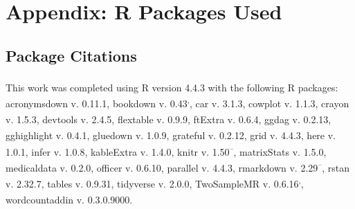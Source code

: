 \documentclass[
]{article}
\begin{document}
\begin{table}
\centering
{}
\end{table}

\newpage

\section{Appendix: R Packages Used}\label{appendix-pkg}

\subsection{Package Citations}\label{package-citations}

This work was completed using R version 4.4.3\textsuperscript{} with the following R packages: acronymsdown v. 0.11.1\textsuperscript{}, bookdown v. 0.43\textsuperscript{,}, car v. 3.1.3\textsuperscript{}, cowplot v. 1.1.3\textsuperscript{}, crayon v. 1.5.3\textsuperscript{}, devtools v. 2.4.5\textsuperscript{}, flextable v. 0.9.9\textsuperscript{}, ftExtra v. 0.6.4\textsuperscript{}, ggdag v. 0.2.13\textsuperscript{}, gghighlight v. 0.4.1\textsuperscript{}, gluedown v. 1.0.9\textsuperscript{}, grateful v. 0.2.12\textsuperscript{}, grid v. 4.4.3\textsuperscript{}, here v. 1.0.1\textsuperscript{}, infer v. 1.0.8\textsuperscript{}, kableExtra v. 1.4.0\textsuperscript{}, knitr v. 1.50\textsuperscript{--}, matrixStats v. 1.5.0\textsuperscript{}, medicaldata v. 0.2.0\textsuperscript{}, officer v. 0.6.10\textsuperscript{}, parallel v. 4.4.3\textsuperscript{}, rmarkdown v. 2.29\textsuperscript{--}, rstan v. 2.32.7\textsuperscript{}, tables v. 0.9.31\textsuperscript{}, tidyverse v. 2.0.0\textsuperscript{}, TwoSampleMR v. 0.6.16\textsuperscript{,}, wordcountaddin v. 0.3.0.9000\textsuperscript{}.
\end{document}
